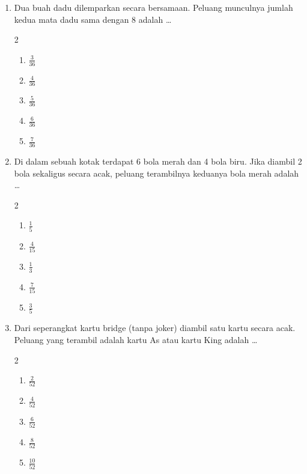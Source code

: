 \documentclass[12pt,a4paper]{article}
\begin{document}
\begin{enumerate}[itemsep=2ex]
    \item Dua buah dadu dilemparkan secara bersamaan. Peluang munculnya jumlah kedua mata dadu sama dengan 8 adalah \dots
    \begin{multicols}{2}
    \begin{enumerate}[label=\Alph*.]
        \item $\frac{3}{36}$
        \item $\frac{4}{36}$
        \item $\frac{5}{36}$
        \item $\frac{6}{36}$
        \item $\frac{7}{36}$
    \end{enumerate}
    \end{multicols}

    \item Di dalam sebuah kotak terdapat 6 bola merah dan 4 bola biru. Jika diambil 2 bola sekaligus secara acak, peluang terambilnya keduanya bola merah adalah \dots
    \begin{multicols}{2}
    \begin{enumerate}[label=\Alph*.]
        \item $\frac{1}{5}$
        \item $\frac{4}{15}$
        \item $\frac{1}{3}$
        \item $\frac{7}{15}$
        \item $\frac{3}{5}$
    \end{enumerate}
    \end{multicols}

    \item Dari seperangkat kartu bridge (tanpa joker) diambil satu kartu secara acak. Peluang yang terambil adalah kartu As atau kartu King adalah \dots
    \begin{multicols}{2}
    \begin{enumerate}[label=\Alph*.]
        \item $\frac{2}{52}$
        \item $\frac{4}{52}$
        \item $\frac{6}{52}$
        \item $\frac{8}{52}$
        \item $\frac{10}{52}$
    \end{enumerate}
    \end{multicols}


\end{enumerate}
\end{document}
